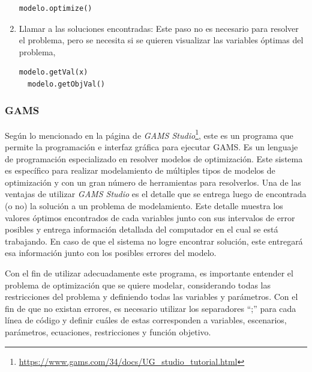 \begin{enumerate}
  \begin{footnotesize}
  \begin{lstlisting}[language=Python]
  modelo.optimize()
  \end{lstlisting}
  \end{footnotesize}
  
  \item  Llamar a las soluciones encontradas: Este paso no es necesario para resolver el problema, pero se necesita si se quieren visualizar las variables óptimas del problema,
  
  \begin{footnotesize}
  \begin{lstlisting}[language=Python]
  modelo.getVal(x)
  modelo.getObjVal()
  \end{lstlisting}
  \end{footnotesize}
  
\end{enumerate}

\subsubsection{GAMS}

Según lo mencionado en la página de \textit{GAMS Studio}\footnote{\url{https://www.gams.com/34/docs/UG_studio_tutorial.html}}, este es un programa que permite la programación e interfaz gráfica para ejecutar GAMS. Es un lenguaje de programación especializado en resolver modelos de optimización. Este sistema es específico para realizar modelamiento de múltiples tipos de modelos de optimización y con un gran número de herramientas para resolverlos. Una de las ventajas de utilizar \emph{GAMS Studio} es el detalle que se entrega luego de encontrada (o no) la solución a un problema de modelamiento. Este detalle muestra los valores óptimos encontrados de cada variables junto con sus intervalos de error posibles y entrega información detallada del computador en el cual se está trabajando. En caso de que el sistema no logre encontrar solución, este entregará esa información junto con los posibles errores del modelo. 
\vspace{2.5mm}

Con el fin de utilizar adecuadamente este programa, es importante entender el problema de optimización que se quiere modelar, considerando todas las restricciones del problema y definiendo todas las variables y parámetros. Con el fin de que no existan errores, es necesario utilizar los separadores “;” para cada línea de código y definir cuáles de estas corresponden a variables, escenarios, parámetros, ecuaciones, restricciones y función objetivo. 
\vspace{2.5mm}

